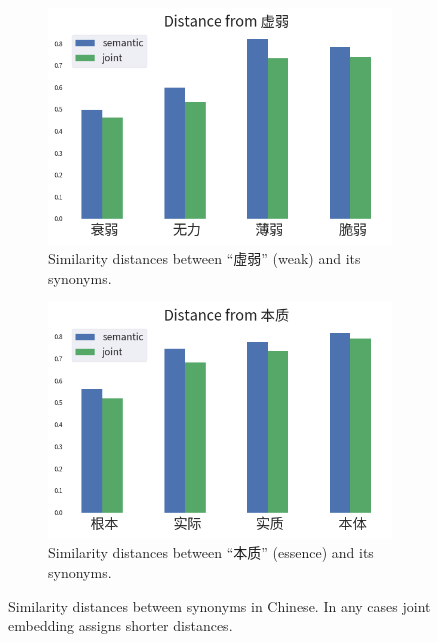 \begin{figure}[h!]
\begin{CJK}{UTF8}{gbsn}
    \begin{subfigure}[b]{0.44\textwidth}
        \centering
        \includegraphics[width=\textwidth]{../images/similarity_zh3.png}
        \caption{Similarity distances between ``虛弱'' (weak) and its synonyms.}
        \label{fig:similarity_zh3}
    \end{subfigure}
    \hspace{2em}
    \begin{subfigure}[b]{0.44\textwidth}
        \centering
        \includegraphics[width=\textwidth]{../images/similarity_zh4.png}
        \caption{Similarity distances between ``本质'' (essence) and its synonyms.}
        \label{fig:similarity_zh4}
    \end{subfigure}
    \caption[Similarity distances between synonyms in Chinese]{Similarity distances between synonyms in Chinese. In any cases joint embedding assigns shorter distances.}
	\label{fig:similarity_zh}
\end{CJK}
\end{figure}


